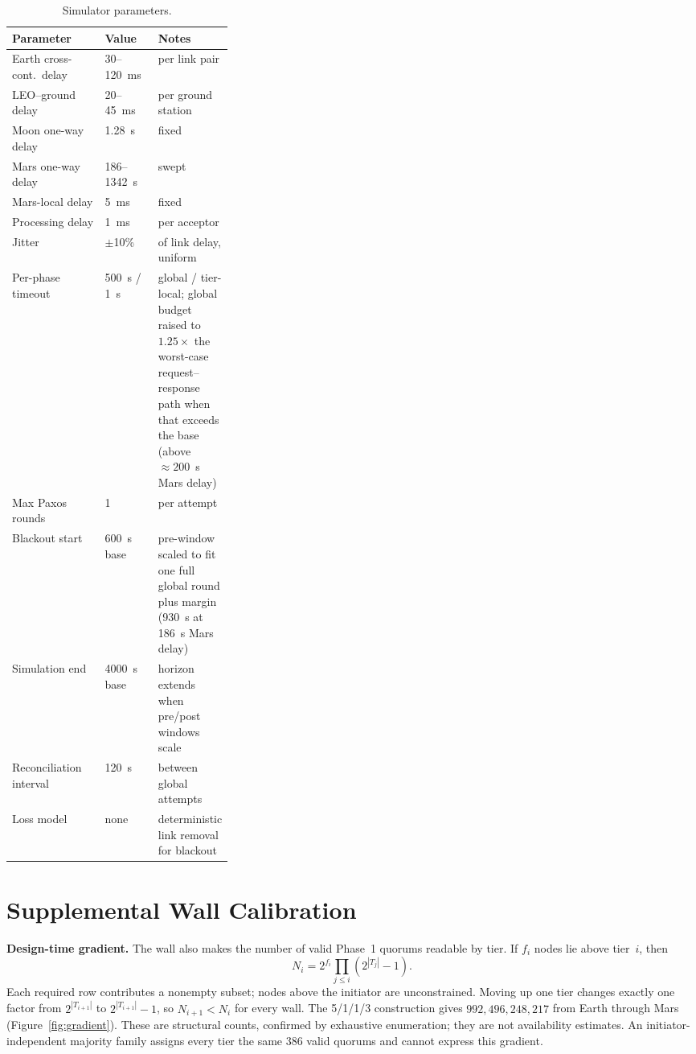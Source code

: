 \documentclass[letterpaper,twocolumn,10pt]{article}
\begin{document}
\begin{table}[t]
\centering
\small
\caption{Simulator parameters.}
\label{tab:params}
\begin{tabular}{llp{0.32\linewidth}}
\toprule
Parameter & Value & Notes \\
\midrule
Earth cross-cont.\ delay & 30--120~ms & per link pair \\
LEO--ground delay & 20--45~ms & per ground station \\
Moon one-way delay & 1.28~s & fixed \\
Mars one-way delay & 186--1342~s & swept \\
Mars-local delay & 5~ms & fixed \\
Processing delay & 1~ms & per acceptor \\
Jitter & $\pm$10\% & of link delay, uniform \\
Per-phase timeout & 500~s / 1~s & global / tier-local; global budget raised to $1.25\times$ the worst-case request--response path when that exceeds the base (above ${\approx}200$~s Mars delay) \\
Max Paxos rounds & 1 & per attempt \\
Blackout start & 600~s base & pre-window scaled to fit one full global round plus margin (930~s at 186~s Mars delay) \\
Simulation end & 4000~s base & horizon extends when pre/post windows scale \\
Reconciliation interval & 120~s & between global attempts \\
Loss model & none & deterministic link removal for blackout \\
\bottomrule
\end{tabular}
\end{table}

\section{Supplemental Wall Calibration}
\label{app:wall-calibration}
\label{sec:expdesign}

\textbf{Design-time gradient.}\label{sec:leadership} The wall also makes the number of valid Phase~1 quorums readable by tier. If $f_i$ nodes lie above tier~$i$, then
\[
N_i=2^{f_i}\prod_{j\le i}(2^{|T_j|}-1).
\]
Each required row contributes a nonempty subset; nodes above the initiator are unconstrained. Moving up one tier changes exactly one factor from $2^{|T_{i+1}|}$ to $2^{|T_{i+1}|}-1$, so $N_{i+1}<N_i$ for every wall. The 5/1/1/3 construction gives $992,496,248,217$ from Earth through Mars (Figure~\ref{fig:gradient}). These are structural counts, confirmed by exhaustive enumeration; they are not availability estimates. An initiator-independent majority family assigns every tier the same 386 valid quorums and cannot express this gradient.
\end{document}
